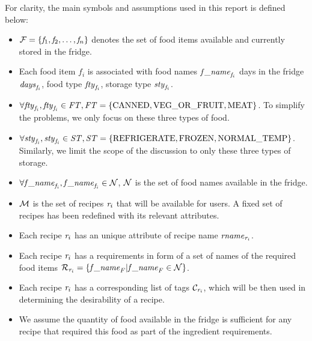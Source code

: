 For clarity, the main symbols and assumptions used in this report is defined below:

\begin{itemize}
    \item $\mathcal{F} = \{ \mathit{f}_1, \mathit{f}_2, \dots, \mathit{f}_n\}$ denotes the set of food items available and currently stored in the fridge.
    \item Each food item $f_i$ is associated with food names $\mathit{f\_name}_{\mathit{f}_i}$ days in the fridge $\mathit{days}_{\mathit{f}_i}$, food type $\mathit{fty}_{\mathit{f}_i}$, storage type $\mathit{sty}_{\mathit{f}_i}$.
    \item $\forall \mathit{fty}_{\mathit{f}_i}, \mathit{fty}_{\mathit{f}_i}\in \mathit{FT}, \mathit{FT} = \{ \text{CANNED}, \text{VEG\_OR\_FRUIT}, \text{MEAT} \}$. To simplify the problems, we only focus on these three types of food.
    \item $\forall \mathit{sty}_{\mathit{f}_i}, \mathit{sty}_{\mathit{f}_i}\in \mathit{ST}, \mathit{ST} = \{ \text{REFRIGERATE}, \text{FROZEN}, \text{NORMAL\_TEMP} \}$. Similarly, we limit the scope of the discussion to only these three types of storage.
    \item $\forall \mathit{f\_name}_{\mathit{f}_i}, \mathit{f\_name}_{\mathit{f}_i} \in \mathcal{N}$, $\mathcal{N}$ is the set of food names available in the fridge.
    \item $\mathcal{M}$ is the set of recipes $\mathit{r}_i$ that will be available for users. A fixed set of recipes has been redefined with its relevant attributes. 
    \item Each recipe $\mathit{r}_i$ has an unique attribute of recipe name $\mathit{rname}_{\mathit{r}_i}$.
    \item Each recipe $\mathit{r}_i$ has a requirements in form of a set of names of the required food items $\mathcal{R}_{\mathit{r}_i} = \{ \mathit{f\_name}_{F} | \mathit{f\_name}_{F} \in \mathcal{N} \}$.
    \item Each recipe $\mathit{r}_i$ has a corresponding list of tags $\mathcal{C}_{\mathit{r}_i}$, which will be then used in determining the desirability of a recipe.
    \item We assume the quantity of food available in the fridge is sufficient for any recipe that required this food as part of the ingredient requirements.
\end{itemize}